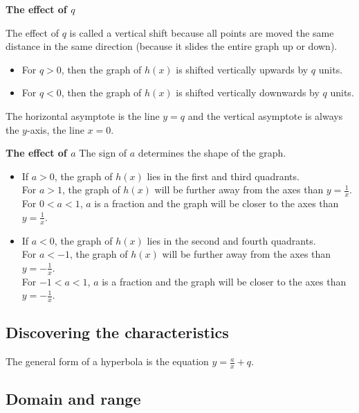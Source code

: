 \textbf{The effect of $q$}\newline

The effect of $q$ is called a vertical shift because all points are moved the same distance in the same direction (because it slides the entire graph up or down). 
\begin{itemize}
\item For $q>0$, then the graph of $h(x)$ is shifted vertically upwards by $q$ units. 
\item For $q<0$, then the graph of $h(x)$ is shifted vertically downwards by $q$ units.
\end{itemize}
The horizontal asymptote is the line $y=q$ and the vertical asymptote is always the $y$-axis, the line $x=0$.\par
\vspace{8pt}
\textbf{The effect of $a$}\newline
The sign of $a$ determines the shape of the graph. 
\begin{itemize}
 \item If $a>0$, the graph of $h(x)$ lies in the first and third quadrants. \\
For $a>1$, the graph of $h(x)$ will be further away from the axes than $y=\frac{1}{x}$.
\\For $0<a<1$, $a$ is a fraction and the graph will be closer to the axes than $y=\frac{1}{x}$. 
\item If $a<0$, the graph of $h(x)$ lies in the second and fourth quadrants.\\
For $a<-1$, the graph of $h(x)$ will be further away from the axes than $y=-\frac{1}{x}$.
\\For $-1<a<1$, $a$ is a fraction and the graph will be closer to the axes than $y=-\frac{1}{x}$. 
\end{itemize}



\subsection*{Discovering the characteristics}  
The general form of a hyperbola is the equation $y=\frac{a}{x}+q$.

\subsection*{Domain and range}


